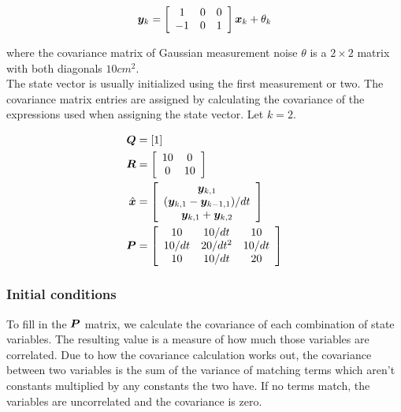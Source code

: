 \begin{equation}
  \bm y_k = \left[
  \begin{array}{ccc}
    1 & 0 & 0 \\
    -1 & 0 & 1
  \end{array} \right] \bm x_k + \theta_k
\end{equation}

where the covariance matrix of Gaussian measurement noise $\theta$ is a
$2 \times 2$ matrix with both diagonals $10 cm^2$. \\

The state vector is usually initialized using the first measurement or two. The
covariance matrix entries are assigned by calculating the covariance of the
expressions used when assigning the state vector. Let $k = 2$.

\begin{align}
  \bm Q &= \left[1\right] \\
  \bm R &= \left[
  \begin{array}{cc}
    10 & 0 \\
    0 & 10
  \end{array} \right] \\
  \hat{\bm x} &= \left[
  \begin{array}{c}
    \bm y_{k,1} \\
    (\bm y_{k,1} - \bm y_{k-1,1})/dt \\
    \bm y_{k,1} + \bm y_{k,2}
  \end{array} \right] \\
  \bm P &= \left[
  \begin{array}{ccc}
    10 & 10/dt & 10 \\
    10/dt & 20/dt^2 & 10/dt \\
    10 & 10/dt & 20
  \end{array} \right]
\end{align}

\subsubsection{Initial conditions}

To fill in the $\bm P$ matrix, we calculate the covariance of each combination
of state variables. The resulting value is a measure of how much those variables
are correlated. Due to how the covariance calculation works out, the covariance
between two variables is the sum of the variance of matching terms which aren't
constants multiplied by any constants the two have. If no terms match, the
variables are uncorrelated and the covariance is zero. \\

